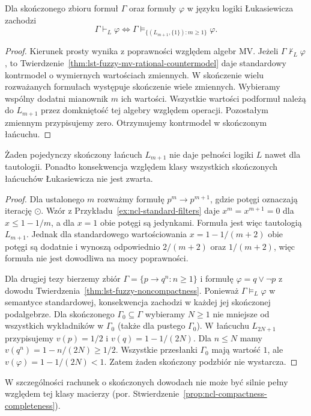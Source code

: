 \begin{wniosek}
\label{cor:ncl-finite-lukasiewicz-completeness}
Dla skończonego zbioru formuł $\Gamma$ oraz formuły
$\varphi$ w języku logiki Łukasiewicza zachodzi
\[
 \Gamma\vdash_L\varphi
 \iff \Gamma\models_{\{(L_{m+1},\{1\}):m\geq1\}}\varphi.
\]
\end{wniosek}
\begin{proof}
Kierunek prosty wynika z poprawności względem algebr MV.
Jeżeli $\Gamma\nvdash_L\varphi$, to
Twierdzenie~\ref{thm:lst-fuzzy-mv-rational-countermodel}
daje standardowy kontrmodel o wymiernych wartościach
zmiennych. W skończenie wielu rozważanych formułach
występuje skończenie wiele zmiennych. Wybieramy
wspólny dodatni mianownik $m$ ich wartości.
Wszystkie wartości podformuł należą do $L_{m+1}$
przez domkniętość tej algebry względem operacji.
Pozostałym zmiennym przypisujemy zero.
Otrzymujemy kontrmodel w skończonym łańcuchu.
\end{proof}
\begin{wniosek}
\label{cor:ncl-finite-mv-completeness-limits}
Żaden pojedynczy skończony łańcuch $L_{m+1}$ nie daje
pełności logiki $L$ nawet dla tautologii. Ponadto
konsekwencja względem klasy wszystkich skończonych
łańcuchów Łukasiewicza nie jest zwarta.
\end{wniosek}
\begin{proof}
Dla ustalonego $m$ rozważmy formułę $p^m\to p^{m+1}$,
gdzie potęgi oznaczają iterację $\odot$.
Wzór z Przykładu~\ref{ex:ncl-standard-filters} daje
$x^m=x^{m+1}=0$ dla $x\leq 1-1/m$, a dla $x=1$
obie potęgi są jedynkami. Formuła jest więc tautologią
$L_{m+1}$. Jednak dla standardowego wartościowania
$x=1-1/(m+2)$ obie potęgi są dodatnie i wynoszą
odpowiednio $2/(m+2)$ oraz $1/(m+2)$, więc formuła
nie jest dowodliwa na mocy poprawności.

Dla drugiej tezy bierzemy zbiór
$\Gamma=\{p\to q^n:n\geq1\}$ i formułę
$\varphi=q\vee\neg p$ z dowodu
Twierdzenia~\ref{thm:lst-fuzzy-noncompactness}.
Ponieważ $\Gamma\models_L\varphi$ w semantyce
standardowej, konsekwencja zachodzi w każdej jej
skończonej podalgebrze.
Dla skończonego $\Gamma_0\subseteq\Gamma$ wybieramy
$N\geq1$ nie mniejsze od wszystkich wykładników
w $\Gamma_0$ (także dla pustego $\Gamma_0$).
W łańcuchu $L_{2N+1}$ przypisujemy
$v(p)=1/2$ i $v(q)=1-1/(2N)$.
Dla $n\leq N$ mamy $v(q^n)=1-n/(2N)\geq1/2$.
Wszystkie przesłanki $\Gamma_0$ mają wartość $1$,
ale $v(\varphi)=1-1/(2N)<1$.
Zatem żaden skończony podzbiór nie wystarcza.
\end{proof}
W szczególności rachunek o skończonych dowodach
nie może być silnie pełny względem tej klasy macierzy
(por. Stwierdzenie~\ref{prop:ncl-compactness-completeness}).

